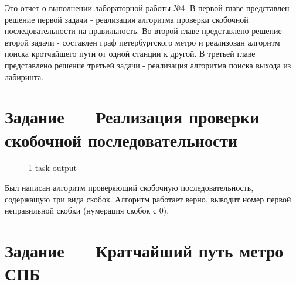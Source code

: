 \documentclass[14pt]{extreport}
\begin{document}
\pagestyle{empty} %

\newpage
{}

\pagestyle{plain} %

\tableofcontents
\newpage
{}

\intro

Это отчет о выполнении лабораторной работы №4. В первой главе представлен решение первой задачи - реализация алгоритма проверки скобочной последовательности на правильность. Во второй главе представлено решение второй задачи - составлен граф петербургского метро и реализован алгоритм поиска кротчайшего пути от одной станции к другой. В третьей главе представлено решение третьей задачи - реализация алгоритма поиска выхода из лабиринта.


\chapter{Задание --- Реализация проверки скобочной последовательности}


\begin{figure}[H]
\caption{1 task output}
\label{grf1}
\end{figure}

Был написан алгоритм проверяющий скобочную последовательность, содержащую три вида скобок. Алгоритм работает верно, выводит номер первой неправильной скобки (нумерация скобок с 0).


\newpage

\chapter{Задание --- Кратчайший путь метро СПБ}
\end{document}
